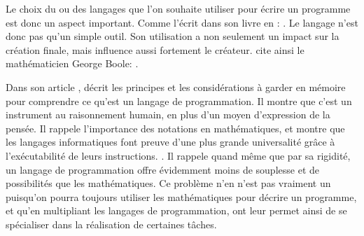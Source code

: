 \documentclass[12pt]{article} %
\begin{document}
Le choix du ou des langages que l'on souhaite utiliser pour écrire un programme est donc un aspect important. Comme l'écrit \citeauthor{Dijkstra1976} dans son livre  en :  \cite{Dijkstra1976}. Le langage n'est donc pas qu'un simple outil. Son utilisation a non seulement un impact sur la création finale, mais influence aussi fortement le créateur. \citeauthor{KIverson-NotationAsToolOfThought} cite ainsi le mathématicien George Boole:  \cite{KIverson-NotationAsToolOfThought}. 

Dans son article , \citeauthor{KIverson-NotationAsToolOfThought} décrit les principes et les considérations à garder en mémoire pour comprendre ce qu'est un langage de programmation. Il montre que c'est un instrument au raisonnement humain, en plus d'un moyen d'expression de la pensée. Il rappele l'importance des notations en mathématiques, et montre que les langages informatiques font preuve d'une plus grande universalité grâce à l'exécutabilité de leurs instructions. . Il rappele quand même que par sa rigidité, un langage de programmation offre évidemment moins de souplesse et de possibilités que les mathématiques. Ce problème n'en n'est pas vraiment un puisqu'on pourra toujours utiliser les mathématiques pour décrire un programme, et qu'en multipliant les langages de programmation, ont leur permet ainsi de se spécialiser dans la réalisation de certaines tâches.
\end{document}
